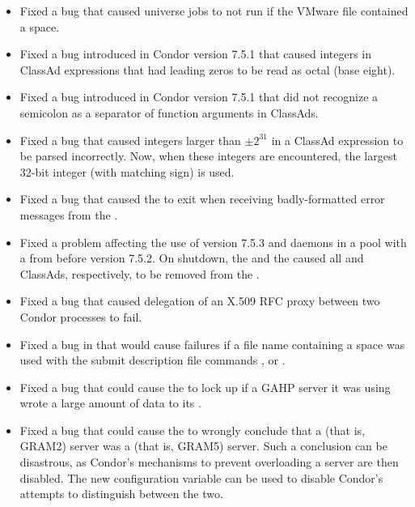 \begin{itemize}
\item Fixed a bug that caused  universe jobs to not run
if the VMware  file contained a space.

\item Fixed a bug introduced in Condor version 7.5.1 that caused integers 
in ClassAd expressions that had leading zeros to be read as octal (base eight).

\item Fixed a bug introduced in Condor version 7.5.1 that did not recognize 
a semicolon as a separator of function arguments in ClassAds.

\item Fixed a bug that caused integers larger than $\pm2^{31}$ in a ClassAd
expression to be parsed incorrectly. Now, when these integers are
encountered, the largest 32-bit integer (with matching sign) is used.

\item Fixed a bug that caused the  to exit when
receiving badly-formatted error messages from the .

\item Fixed a problem affecting the use of version 7.5.3  and
   daemons in a pool with a  from before
  version 7.5.2.  On shutdown, the  and the 
  caused all  and  ClassAds, respectively,
  to be removed from the .

\item Fixed a bug that caused delegation of an X.509 RFC proxy between
two Condor processes to fail.

\item Fixed a bug in  that would cause failures if a file
name containing a space was used with the submit description file commands
,  or
.

\item Fixed a bug that could cause the  to lock up if
a GAHP server it was using wrote a large amount of data to its .

\item Fixed a bug that could cause the  to wrongly
conclude that a  (that is, GRAM2) server was a 
(that is, GRAM5) server.
Such a conclusion can be disastrous, as Condor's mechanisms to
prevent overloading a  server are then disabled. The new
configuration variable  can be used 
to disable Condor's attempts to distinguish between the two.


\end{itemize}
